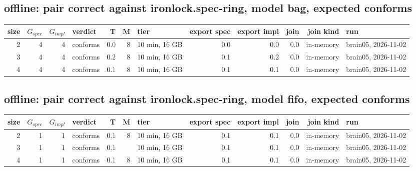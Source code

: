 \documentclass[10pt]{article}
\begin{document}
\subsection*{offline: pair \textsf{correct} against \textsf{ironlock.spec-ring}, model bag, expected conforms}
\begin{longtable}{@{}rrrlrrlrrrrl@{}}
\toprule
size & $G_{\mathit{spec}}$ & $G_{\mathit{impl}}$ & verdict & T & M & tier & export spec & export impl & join & join kind & run \\
\midrule
\endhead
\color{red} 2 & 4 & 4 & conforms & 0.0 & 8 & 10 min, 16 GB & 0.0 & 0.0 & 0.0 & in-memory & brain05, 2026-11-02 \\
\color{red} 3 & 4 & 4 & conforms & 0.2 & 8 & 10 min, 16 GB & 0.1 & 0.2 & 0.0 & in-memory & brain05, 2026-11-02 \\
\color{red} 4 & 4 & 4 & conforms & 0.1 & 8 & 10 min, 16 GB & 0.1 & 0.1 & 0.0 & in-memory & brain05, 2026-11-02 \\
\bottomrule
\end{longtable}
\subsection*{offline: pair \textsf{correct} against \textsf{ironlock.spec-ring}, model fifo, expected conforms}
\begin{longtable}{@{}rrrlrrlrrrrl@{}}
\toprule
size & $G_{\mathit{spec}}$ & $G_{\mathit{impl}}$ & verdict & T & M & tier & export spec & export impl & join & join kind & run \\
\midrule
\endhead
\color{red} 2 & 1 & 1 & conforms & 0.1 & 8 & 10 min, 16 GB & 0.1 & 0.1 & 0.0 & in-memory & brain05, 2026-11-02 \\
\color{red} 3 & 1 & 1 & conforms & 0.1 &  & 10 min, 16 GB & 0.1 & 0.1 & 0.0 & in-memory & brain05, 2026-11-02 \\
\color{red} 4 & 1 & 1 & conforms & 0.1 & 8 & 10 min, 16 GB & 0.1 & 0.1 & 0.0 & in-memory & brain05, 2026-11-02 \\
\bottomrule
\end{longtable}
\end{document}
